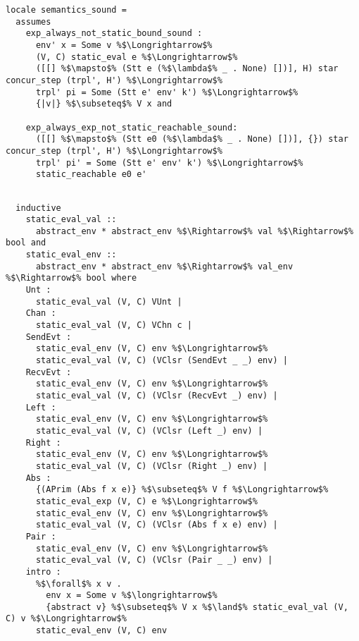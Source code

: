 \documentclass{article}
\begin{document}
\begin{lstlisting}[style=codestyle1, escapechar=\%]
locale semantics_sound =
  assumes
    exp_always_not_static_bound_sound :
      env' x = Some v %$\Longrightarrow$%
      (V, C) static_eval e %$\Longrightarrow$%
      ([[] %$\mapsto$% (Stt e (%$\lambda$% _ . None) [])], H) star concur_step (trpl', H') %$\Longrightarrow$%
      trpl' pi = Some (Stt e' env' k') %$\Longrightarrow$%
      {|v|} %$\subseteq$% V x and

    exp_always_exp_not_static_reachable_sound: 
      ([[] %$\mapsto$% (Stt e0 (%$\lambda$% _ . None) [])], {}) star concur_step (trpl', H') %$\Longrightarrow$%
      trpl' pi' = Some (Stt e' env' k') %$\Longrightarrow$%
      static_reachable e0 e'
  \end{lstlisting}


\begin{lstlisting}[style=codestyle1, escapechar=\%]

  inductive 
    static_eval_val ::
      abstract_env * abstract_env %$\Rightarrow$% val %$\Rightarrow$% bool and  
    static_eval_env ::
      abstract_env * abstract_env %$\Rightarrow$% val_env %$\Rightarrow$% bool where
    Unt :
      static_eval_val (V, C) VUnt |
    Chan :
      static_eval_val (V, C) VChn c |
    SendEvt :
      static_eval_env (V, C) env %$\Longrightarrow$%
      static_eval_val (V, C) (VClsr (SendEvt _ _) env) |
    RecvEvt :
      static_eval_env (V, C) env %$\Longrightarrow$%
      static_eval_val (V, C) (VClsr (RecvEvt _) env) |
    Left :
      static_eval_env (V, C) env %$\Longrightarrow$%
      static_eval_val (V, C) (VClsr (Left _) env) |
    Right :
      static_eval_env (V, C) env %$\Longrightarrow$%
      static_eval_val (V, C) (VClsr (Right _) env) |
    Abs :
      {(APrim (Abs f x e)} %$\subseteq$% V f %$\Longrightarrow$% 
      static_eval_exp (V, C) e %$\Longrightarrow$% 
      static_eval_env (V, C) env %$\Longrightarrow$%
      static_eval_val (V, C) (VClsr (Abs f x e) env) |
    Pair :
      static_eval_env (V, C) env %$\Longrightarrow$%
      static_eval_val (V, C) (VClsr (Pair _ _) env) |
    intro :  
      %$\forall$% x v .
        env x = Some v %$\longrightarrow$%
        {abstract v} %$\subseteq$% V x %$\land$% static_eval_val (V, C) v %$\Longrightarrow$%
      static_eval_env (V, C) env

  \end{lstlisting}
\end{document}
